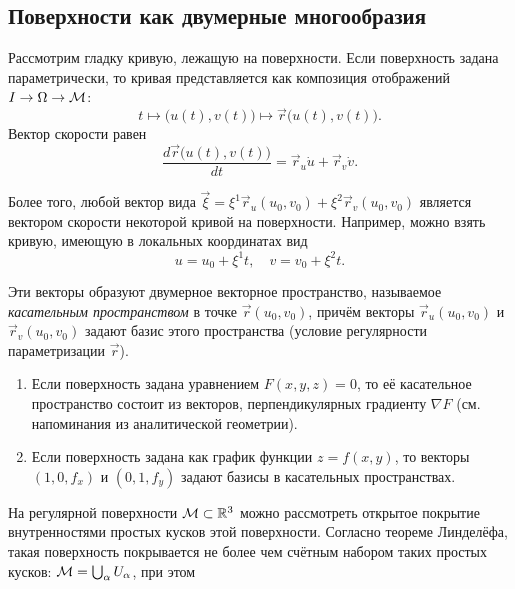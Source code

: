 \subsection{Поверхности как двумерные многообразия}

Рассмотрим гладку кривую, лежащую на поверхности. Если поверхность задана параметрически, то кривая представляется как композиция отображений $I \to \Omega \to \mathcal{M}$:
\[
	t \mapsto \big(u(t), v(t)\big) \mapsto \vec{r}\big(u(t), v(t)\big).
\]
Вектор скорости равен
\[
	\frac{d\vec{r}\big(u(t), v(t)\big)}{dt} = \vec{r}_u\dot{u} + \vec{r}_v\dot{v}.
\]

Более того, любой вектор вида $\vec{\xi} = \xi^1\vec{r}_u(u_0, v_0) + \xi^2\vec{r}_v(u_0, v_0)$ является вектором скорости некоторой кривой на поверхности. Например, можно взять кривую, имеющую в локальных координатах вид
\[
	u = u_0 + \xi^1t,\quad v = v_0 + \xi^2t.
\]

Эти векторы образуют двумерное векторное пространство, называемое \textit{касательным пространством} в точке $\vec{r}(u_0, v_0)$, причём векторы $\vec{r}_u(u_0, v_0)$ и $\vec{r}_v(u_0, v_0)$ задают базис этого пространства (условие регулярности параметризации $\vec{r}$).

\begin{example}
	\begin{enumerate}[nolistsep, label=(\arabic*)]
		\item Если поверхность задана уравнением $F(x, y, z) = 0$, то её касательное пространство состоит из векторов, перпендикулярных градиенту $\nabla F$ (см. напоминания из аналитической геометрии).
		\item Если поверхность задана как график функции $z = f(x, y)$, то векторы $(1, 0, f_x)$ и $(0, 1, f_y)$ задают базисы в касательных пространствах.
	\end{enumerate}
\end{example}

На регулярной поверхности $\mathcal{M} \subset \mathbb{R}^3$ можно рассмотреть открытое покрытие внутренностями простых кусков этой поверхности. Согласно теореме Линделёфа\footnotemark, такая поверхность покрывается не более чем счётным набором таких простых кусков: $\mathcal{M} = \bigcup_\alpha U_\alpha$, при этом


